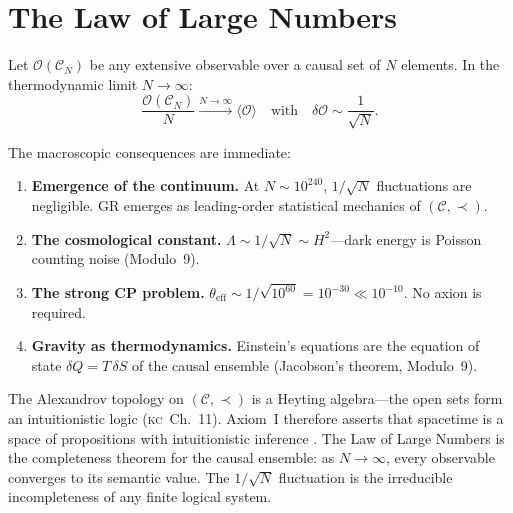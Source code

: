 \documentclass[11pt, a4paper, openany]{book}
\newcommand{\KC}[1]{\textnormal{(\textsc{kc}~#1)}}
\newcounter{thm}[chapter]
\begin{document}
\section{The Law of Large Numbers}\label{sec:lln}

\begin{theorem}\label{thm:lln}
Let $\mathcal{O}(\mathcal{C}_N)$ be any extensive observable over a
causal set of $N$ elements. In the thermodynamic limit $N \to \infty$:
\[
  \frac{\mathcal{O}(\mathcal{C}_N)}{N}
  \xrightarrow{N \to \infty} \langle \mathcal{O} \rangle
  \quad\text{with}\quad
  \delta\mathcal{O} \sim \frac{1}{\sqrt{N}}.
\]
\end{theorem}

\noindent
The macroscopic consequences are immediate:
\begin{enumerate}
  \item \textbf{Emergence of the continuum.} At $N \sim 10^{240}$,
    $1/\sqrt{N}$ fluctuations are negligible. GR emerges as leading-order
    statistical mechanics of $(\mathcal{C}, \prec)$.
  \item \textbf{The cosmological constant.} $\Lambda \sim 1/\sqrt{N}
    \sim H^2$---dark energy is Poisson counting noise (Modulo~9).
  \item \textbf{The strong CP problem.} $\theta_{\mathrm{eff}} \sim
    1/\sqrt{10^{60}} = 10^{-30} \ll 10^{-10}$. No axion is required.
  \item \textbf{Gravity as thermodynamics.} Einstein's equations are
    the equation of state $\delta Q = T\,\delta S$ of the causal
    ensemble (Jacobson's theorem, Modulo~9).
\end{enumerate}

\begin{logicalreading}
The Alexandrov topology on $(\mathcal{C}, \prec)$ is a Heyting
algebra---the open sets form an intuitionistic logic \KC{Ch.~11}. Axiom~I
therefore asserts that spacetime is a space of propositions with
intuitionistic inference \cite{stone1936}. The Law of Large Numbers is
the completeness theorem for the causal ensemble: as $N \to \infty$,
every observable converges to its semantic value. The $1/\sqrt{N}$
fluctuation is the irreducible incompleteness of any finite logical
system.
\end{logicalreading}
\end{document}
